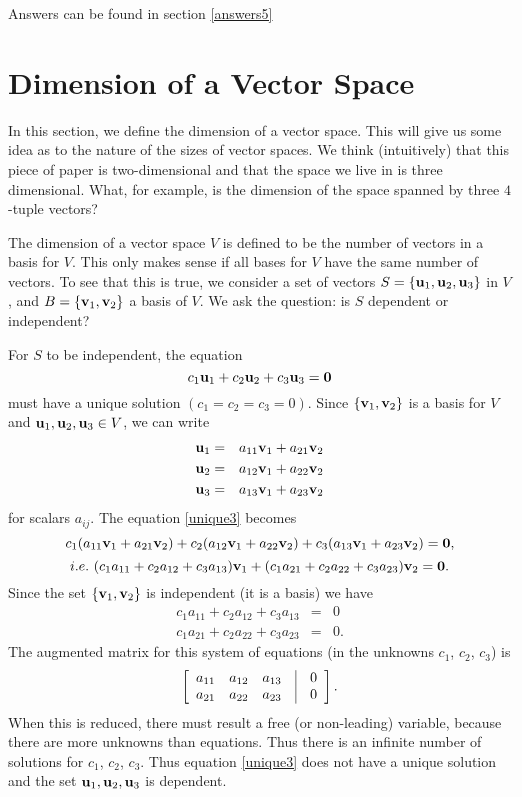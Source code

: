 \noindent Answers can be found in section \ref{answers5}

\section{Dimension of a Vector Space}
\label{ssec.dimension} 

In this section, we define the dimension of a vector space. This
will give us some idea as to the nature of the sizes of vector
spaces. We think (intuitively) that this piece of paper is
two-dimensional and that the space we live in is three
dimensional. What, for example, is the dimension of the space
spanned by three $4$-tuple vectors?

The dimension of a vector space $V$ is defined to be the number of
vectors in a basis for $V$. This only makes sense if all bases for
$V$ have the same number of vectors. To see that this is true, we
consider a set of vectors $S=\{ {\bf u}_1, {\bf u}_2,{\bf u}_3\}$
in $V$, and $B=\{ {\bf v}_1, {\bf v}_2\}$ a basis of $V$. We ask
the question: is $S$ dependent or independent?

For $S$ to be independent, the equation
\begin{equation} \label{unique3}
c_1{\bf u}_1+c_2{\bf u}_2+c_3{\bf u}_3={\bf 0}
\end{equation}
must have a unique solution $(c_1=c_2=c_3=0)$. Since $\{ {\bf
v}_1, {\bf v}_2 \}$ is a basis for $V$ and ${\bf u}_1,{\bf
u}_2,{\bf u}_3 \in V$, we can write
\begin{eqnarray*}
{\bf u}_1&=&a_{11}{\bf v}_1+a_{21}{\bf v}_2 \\
{\bf u}_2&=&a_{12}{\bf v}_1+a_{22}{\bf v}_2 \\
{\bf u}_3&=&a_{13}{\bf v}_1+a_{23}{\bf v}_2
\end{eqnarray*}
for scalars $a_{ij}$. The equation \ref{unique3} becomes
$$c_1(a_{11}{\bf v}_1+a_{21}{\bf v}_2)+c_2(a_{12}{\bf v}_1+a_{22}{\bf
v}_2)+c_3(a_{13}{\bf v}_1+a_{23}{\bf v}_2)={\bf 0}, $$
$$i.e.~(c_1a_{11}+c_2a_{12}+c_3a_{13}){\bf v}_1+ (c_1a_{21}+c_2a_{22}+c_3a_{23}){\bf
v}_2={\bf 0}.$$ Since the set $\{ {\bf v}_1,{\bf v}_2 \}$ is
independent (it is a basis) we have
\begin{eqnarray*}
c_1a_{11}+c_2a_{12}+c_3a_{13}&=&0 \\
c_1a_{21}+c_2a_{22}+c_3a_{23}&=&0.
\end{eqnarray*}
The augmented matrix for this system of equations (in the unknowns
$c_1$, $c_2$, $c_3$) is $$ \left [ \begin{array}{rrrcr}
        a_{11} & a_{12} & a_{13} & \vline& 0 \\
        a_{21} & a_{22} & a_{23} & \vline& 0 \end{array} \right ].$$
When this is reduced, there must result a free (or non-leading)
variable, because there are more unknowns than equations. Thus
there is an infinite number of solutions for $c_1$, $c_2$, $c_3$.
Thus equation \ref{unique3} does not have a unique solution and
the set ${{\bf u}_1, {\bf u}_2, {\bf u}_3}$ is dependent.

